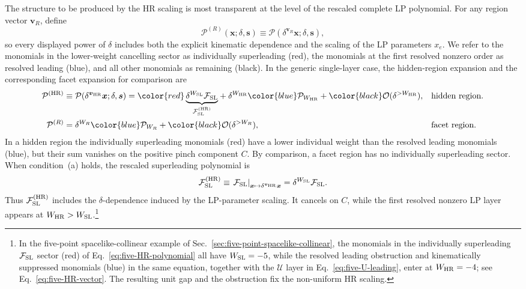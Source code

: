 \documentclass[a4paper,11pt]{article}
\newcommand{\x}{\boldsymbol{x}}
\newcommand{\s}{\boldsymbol{s}}
\newcommand{\HR}{\mathrm{HR}}
\newcommand{\FSL}{\mathcal F_{\rm SL}}
\newcommand{\WSL}{W_{\rm SL}}
\newcommand{\WHR}{W_{\rm HR}}
\newcommand{\SLcolour}[1]{{\color{red}#1}}
\newcommand{\HRcolour}[1]{{\color{blue}#1}}
\newcommand{\Othercolour}[1]{{\color{black}#1}}
\begin{document}
The structure to be produced by the HR scaling is most transparent at the
level of the rescaled complete LP polynomial.  For any region vector
\(\boldsymbol v_R\), define
\begin{equation}
 \mathcal P^{(R)}(\x;\delta,\s)
 \equiv
 \mathcal P(\delta^{\boldsymbol v_R}\x;\delta,\s),
\label{eq:rescaled-LP-polynomial}
\end{equation}
so every displayed power of \(\delta\) includes both the explicit kinematic
dependence and the scaling of the LP parameters \(x_e\).  We refer to the
monomials in the lower-weight cancelling sector as individually superleading
(red), the monomials at the first resolved nonzero order as resolved leading
(blue), and all other monomials as remaining (black).  In the generic
single-layer case, the hidden-region expansion and the corresponding facet
expansion for comparison are
\begin{subequations}
\label{eq:region-colour-schematics}
\begin{align}
 \mathcal P^{(\HR)}
 &\equiv\mathcal P(\delta^{\boldsymbol v_{\HR}}\x;\delta,\s)
 =\SLcolour{\underbrace{\delta^{\WSL}\FSL}_{\FSL^{(\HR)}}}
   +\delta^{\WHR}\HRcolour{\mathcal P_{\WHR}}
   +\Othercolour{\mathcal O(\delta^{>\WHR})},
 &&\text{hidden region}.
\label{eq:HR-colour-schematic}\\
 \mathcal P^{(R)}
 &=\delta^{W_R}\HRcolour{\mathcal P_{W_R}}
   +\Othercolour{\mathcal O(\delta^{>W_R})},
 &&\text{facet region}.
\label{eq:facet-colour-schematic}
\end{align}
\end{subequations}
In a hidden region the individually superleading monomials (red) have a lower
individual weight than the resolved leading monomials (blue), but their sum
vanishes on the positive pinch component \(C\).  By comparison, a facet
region has no individually superleading sector.  When condition~(a) holds,
the rescaled superleading polynomial is
\begin{equation}
 \FSL^{(\HR)}
 \equiv
 \left.\FSL\right|_{\x\mapsto\delta^{\boldsymbol v_{\HR}}\x}
 =\delta^{\WSL}\FSL.
\label{eq:rescaled-SL-polynomial}
\end{equation}
Thus \(\FSL^{(\HR)}\) includes the \(\delta\)-dependence induced by the
LP-parameter scaling.  It cancels on \(C\), while the first resolved nonzero
LP layer appears at \(\WHR>\WSL\).\footnote{In the five-point
spacelike-collinear example of
Sec.~\ref{sec:five-point-spacelike-collinear}, the monomials in the
individually superleading \(\FSL\) sector (red) of
Eq.~\eqref{eq:five-HR-polynomial} all have \(\WSL=-5\), while the resolved
leading obstruction and kinematically suppressed monomials (blue) in the same
equation, together with the \(\mathcal U\) layer in
Eq.~\eqref{eq:five-U-leading}, enter at \(\WHR=-4\); see
Eq.~\eqref{eq:five-HR-vector}.  The resulting unit gap and the obstruction
fix the non-uniform HR scaling.}
\end{document}
